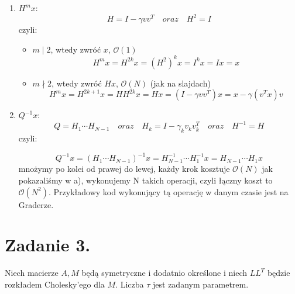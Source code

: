 \documentclass[a4paper]{article}
\begin{document}
      \begin{enumerate}[label=(\alph*)]
         \item
            $H^{m} x$:
            \[
               H = I - \gamma vv^{T} \quad
               oraz \quad
               H^{2} = I
            \]
            czyli:

            \begin{itemize}
               \item
                  $m \mid 2$, wtedy zwróć $x$, $\mathcal{O}(1)$
                  \[
                     H^{m} x =
                     H^{2k} x =
                     (H^{2})^{k} x =
                     I^{k} x =
                     I x = x
                  \]

               \item
                  $m \nmid  2$, wtedy zwróć $H x$, $\mathcal{O}(N)$ (jak na slajdach)
                  \[
                     H^{m} x =
                     H^{2k + 1} x =
                     H H^{2k} x =
                     H x =
                     (I - \gamma vv^{T}) x =
                     x - \gamma (v^{T} x) v
                  \]
            \end{itemize}

         \item
            $Q^{-1} x$:
            \[
               Q = H_{1} \cdots H_{N-1} \quad
               oraz \quad
               H_{k} = I - \gamma_{k} v_{k} v_{k}^{T} \quad
               oraz \quad
               H^{-1} = H
            \]
            czyli:

            \[
               Q^{-1} x =
               (H_{1} \cdots H_{N-1})^{-1} x =
               H_{N-1}^{-1} \cdots H_{1}^{-1} x =
               H_{N-1} \cdots H_{1} x
            \]
            mnożymy po kolei od prawej do lewej, każdy krok kosztuje $\mathcal{O}(N)$
            jak pokazaliśmy w a), wykonujemy N takich operacji, czyli łączny koszt to $\mathcal{O}(N^{2})$.
            Przykładowy kod wykonujący tą operację w danym czasie jest na Graderze.
      \end{enumerate}


   \section*{Zadanie 3.}

      Niech macierze $A, M$ będą symetryczne i dodatnio określone i niech $L L^{T}$ będzie rozkładem Cholesky'ego dla $M$.
      Liczba $\tau$ jest zadanym parametrem.
\end{document}
